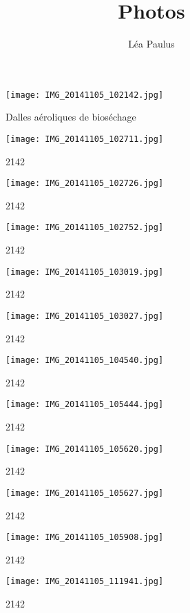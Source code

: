 \documentclass{article}
\title{Photos}
\author{Léa Paulus}
\begin{document}
\maketitle


\begin{figure}
  \centering
  \texttt{[image: IMG\_20141105\_102142.jpg]}
  \caption{Dalles aéroliques de bioséchage}
  \label{fig:2142}
\end{figure}
\begin{figure}
  \centering
  \texttt{[image: IMG\_20141105\_102711.jpg]}
  \caption{2142}
  \label{fig:2142}
\end{figure}
\begin{figure}
  \centering
  \texttt{[image: IMG\_20141105\_102726.jpg]}
  \caption{2142}
  \label{fig:2142}
\end{figure}
\begin{figure}
  \centering
  \texttt{[image: IMG\_20141105\_102752.jpg]}
  \caption{2142}
  \label{fig:2142}
\end{figure}
\begin{figure}
  \centering
  \texttt{[image: IMG\_20141105\_103019.jpg]}
  \caption{2142}
  \label{fig:2142}
\end{figure}
\begin{figure}
  \centering
  \texttt{[image: IMG\_20141105\_103027.jpg]}
  \caption{2142}
  \label{fig:2142}
\end{figure}
\begin{figure}
  \centering
  \texttt{[image: IMG\_20141105\_104540.jpg]}
  \caption{2142}
  \label{fig:2142}
\end{figure}
\begin{figure}
  \centering
  \texttt{[image: IMG\_20141105\_105444.jpg]}
  \caption{2142}
  \label{fig:2142}
\end{figure}
\begin{figure}
  \centering
  \texttt{[image: IMG\_20141105\_105620.jpg]}
  \caption{2142}
  \label{fig:2142}
\end{figure}
\begin{figure}
  \centering
  \texttt{[image: IMG\_20141105\_105627.jpg]}
  \caption{2142}
  \label{fig:2142}
\end{figure}
\begin{figure}
  \centering
  \texttt{[image: IMG\_20141105\_105908.jpg]}
  \caption{2142}
  \label{fig:2142}
\end{figure}
\begin{figure}
  \centering
  \texttt{[image: IMG\_20141105\_111941.jpg]}
  \caption{2142}
  \label{fig:2142}
\end{figure}
\end{document}
